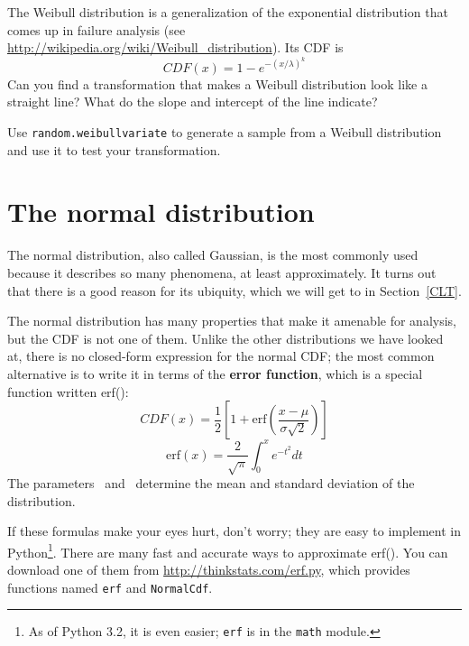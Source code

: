 \documentclass[12pt]{book}
\begin{document}
\begin{exercise}
\label{weibull}

The Weibull distribution is a generalization of the exponential
distribution that comes up in failure analysis
(see \url{http://wikipedia.org/wiki/Weibull_distribution}).  Its CDF is
%
\[ CDF(x) = 1 - e^{-(x / \lambda)^k} \]
%
Can you find a transformation that makes a Weibull distribution look
like a straight line?  What do the slope and intercept of the
line indicate?

Use {\tt random.weibullvariate} to generate a sample from a
Weibull distribution and use it to test your transformation.

\end{exercise}


\section{The normal distribution}
\label{normal}

\newcommand{\erf}{\mathrm{erf}}

The normal distribution, also called Gaussian, is the most commonly
used because it describes so many phenomena, at least approximately.
It turns out that there is a good reason for its ubiquity, which we
will get to in Section~\ref{CLT}.

The normal distribution has many properties that make it amenable for
analysis, but the CDF is not one of them.  Unlike the
other distributions we have looked at, there is no closed-form
expression for the normal CDF; the most common alternative is to write
it in terms of the {\bf error function}, which is a special function
written erf(\x):
%
\[ CDF(x) = \frac{1}{2} \left[ 1 +
  \erf \left( \frac{x - \mu}{\sigma \sqrt{2}} \right) \right] \]
%
\[ \erf(x) = \frac{2}{\sqrt{\pi}} \int_{0}^x e^{-t^2} dt \]
%
The parameters \mymu~and \mysigma~determine the mean and standard
deviation of the distribution.

If these formulas make your eyes hurt, don't worry; they are easy to
implement in Python\footnote{As of Python 3.2, it is even easier; 
{\tt erf} is in the {\tt math} module.}.  There are many fast and
accurate ways to approximate erf(\x).  You can download one of them
from \url{http://thinkstats.com/erf.py}, which provides functions named
{\tt erf} and {\tt NormalCdf}.
\end{document}
